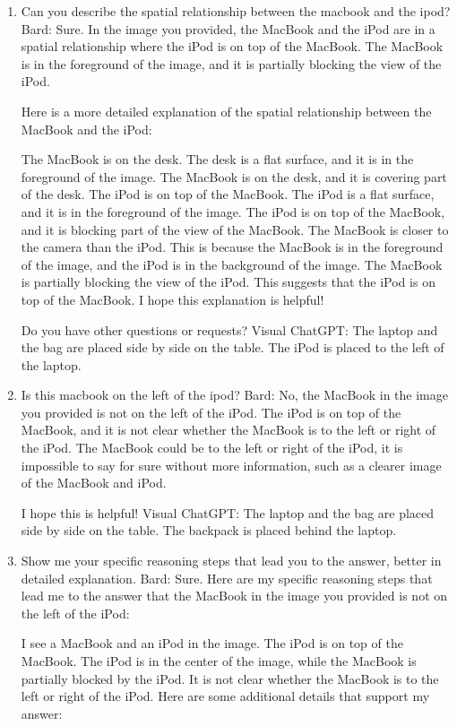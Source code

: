 \begin{enumerate}
    \item Can you describe the spatial relationship between the macbook and the ipod?
    \subitem Bard: 
    Sure. In the image you provided, the MacBook and the iPod are in a spatial relationship where the iPod is on top of the MacBook. The MacBook is in the foreground of the image, and it is partially blocking the view of the iPod.
    
    Here is a more detailed explanation of the spatial relationship between the MacBook and the iPod:
    
    The MacBook is on the desk. The desk is a flat surface, and it is in the foreground of the image. The MacBook is on the desk, and it is covering part of the desk.
    The iPod is on top of the MacBook. The iPod is a flat surface, and it is in the foreground of the image. The iPod is on top of the MacBook, and it is blocking part of the view of the MacBook.
    The MacBook is closer to the camera than the iPod. This is because the MacBook is in the foreground of the image, and the iPod is in the background of the image.
    The MacBook is partially blocking the view of the iPod. This suggests that the iPod is on top of the MacBook.
    I hope this explanation is helpful!
    
    Do you have other questions or requests?
    \subitem Visual ChatGPT: The laptop and the bag are placed side by side on the table. The iPod is placed to the left of the laptop.
    \item Is this macbook on the left of the ipod?
    \subitem Bard: 
    No, the MacBook in the image you provided is not on the left of the iPod. The iPod is on top of the MacBook, and it is not clear whether the MacBook is to the left or right of the iPod. The MacBook could be to the left or right of the iPod, it is impossible to say for sure without more information, such as a clearer image of the MacBook and iPod.

    I hope this is helpful!
    \subitem Visual ChatGPT: The laptop and the bag are placed side by side on the table. The backpack is placed behind the laptop.
    \item Show me your specific reasoning steps that lead you to the answer, better in detailed explanation.
    \subitem Bard: 
    Sure. Here are my specific reasoning steps that lead me to the answer that the MacBook in the image you provided is not on the left of the iPod:
    
    I see a MacBook and an iPod in the image.
    The iPod is on top of the MacBook.
    The iPod is in the center of the image, while the MacBook is partially blocked by the iPod.
    It is not clear whether the MacBook is to the left or right of the iPod.
    Here are some additional details that support my answer:
    

\end{enumerate}
